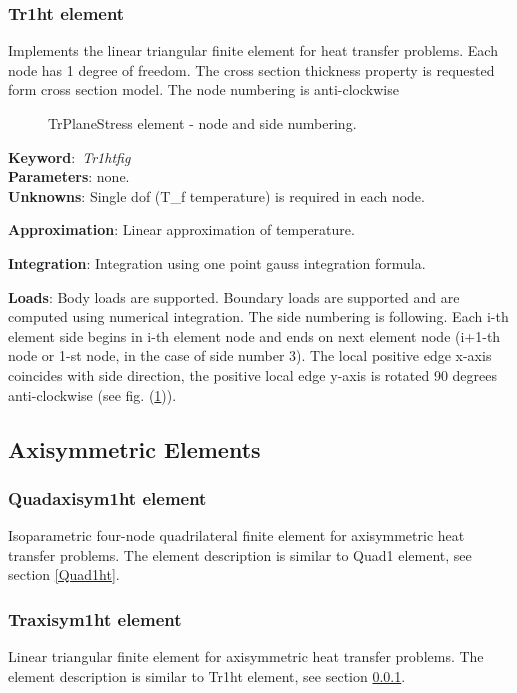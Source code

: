 \documentclass[12pt,dvips]{article}
\newcommand{\descitem}[1]{{\noindent \bf #1}:}
\newcommand{\elemkeyword}[1]{\descitem{Keyword}~{\em #1}}
\begin{document}
\subsubsection{Tr1ht element}
\label{Tr1ht}
Implements the linear triangular finite element for heat transfer problems. Each node has 1 degree of freedom.
The cross section thickness property is requested form cross section model.
The node numbering is anti-clockwise

\begin{figure}[htb]
\begin{center}\end{center}
\caption{TrPlaneStress element - node and side numbering.}
\label{Tr1htfig}
\end{figure}

\elemkeyword{Tr1htfig}\\
\descitem{Parameters} none.\\
\descitem{Unknowns}
Single dof (T\_f temperature) is  required in each node.

\descitem{Approximation} Linear approximation of temperature.

\descitem{Integration}
Integration using one point gauss integration formula.

\descitem{Loads} Body loads are supported. Boundary loads are
supported and are computed  using numerical integration. The side numbering is
following. Each i-th element side begins in i-th element node and
ends on next element node (i+1-th node or 1-st node, in the case of 
side number 3). The local positive edge x-axis coincides with side
direction, the positive local edge y-axis is rotated 90 degrees
anti-clockwise (see fig. (\ref{Tr1htfig})).



\subsection{Axisymmetric Elements}
\subsubsection{Quadaxisym1ht element}
Isoparametric four-node quadrilateral finite element for
axisymmetric heat transfer problems. The element description is
similar to Quad1 element, see section \ref{Quad1ht}.


\subsubsection{Traxisym1ht element}
Linear triangular finite element for axisymmetric heat transfer
problems. The element description is
similar to Tr1ht element, see section \ref{Tr1ht}.
\end{document}
